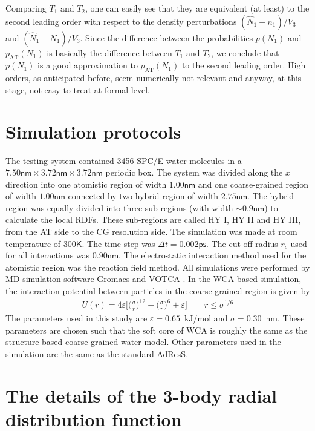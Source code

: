 \documentclass[aip,jcp,a4paper,reprint,onecolumn]{revtex4-1}
\newcommand{\AT}{{\textrm{{AT}}}}
\begin{document}
Comparing $T_1$ and $T_2$, one can easily see that they are equivalent (at least) to the second leading
order with respect to the density perturbations
$(\hat N_1 - n_1)/{V_3}$
and $(\hat N_1 - N_1)/{V_3}$.
Since the difference between the probabilities
$p(N_1)$ and $p_{\AT}(N_1)$ is basically the difference between $T_1$
and $T_2$, we conclude that $p(N_1)$ is a good approximation to
$p_{\AT}(N_1)$ to the second leading order. High orders, as anticipated before, seem numerically not relevant and anyway, at this stage, not easy to treat at formal level.


\section{Simulation protocols}
The testing system contained 3456 SPC/E \cite{berendsen1987missing}
water molecules in a $7.50\textsf{nm}\times 3.72\textsf{nm}\times
3.72\textsf{nm}$ periodic box. The system was divided along the $x$ direction
into one atomistic region of width $1.00\textsf{nm}$ and one
coarse-grained region of width $1.00\textsf{nm}$ connected by two
hybrid region of width $2.75\textsf{nm}$.
The hybrid region was equally divided into three sub-regions (with width $\sim 0.9\textsf{nm}$)
to calculate the local RDFs.
These sub-regions are called HY I, HY II and HY III, from the AT side to the CG resolution side.
The simulation was made at
room temperature of $300\textsf{K}$. The time step was $\Delta t =
0.002\textsf{ps}$. The cut-off radius $r_{c}$ used for all interactions was
$0.90\textsf{nm}$. The electrostatic interaction method used for the
atomistic region was the reaction field method. All simulations were
performed by MD simulation software Gromacs \cite{gromacs}
and VOTCA \cite{ruehle2009versatile}.
In the WCA-based simulation, the interaction potential between particles in the coarse-grained region is given by
\begin{align}
  U(r) = 4\varepsilon
  \big[
  \big(\frac\sigma r\big)^{12}
  -
  \big(\frac\sigma r\big)^{6}
  + \varepsilon
  \big]
  \qquad  r\leq \sigma^{1/6}
\end{align}
The parameters used in this study are $\varepsilon = 0.65$~\textsf{kJ/mol}
and $\sigma = 0.30$~\textsf{nm}. These parameters are chosen such that
the soft core of WCA is roughly the same as the structure-based coarse-grained
water model.
Other parameters used in the simulation are the
same as the standard AdResS.



\section{The details of the 3-body radial distribution function}
\label{app:tmp1}
\end{document}
